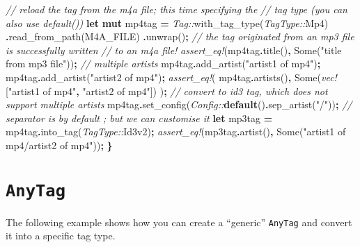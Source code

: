 \documentclass[
]{book}
\newenvironment{Shaded}{\begin{snugshade}}{\end{snugshade}}
\newcommand{\CommentTok}[1]{\textcolor[rgb]{0.56,0.35,0.01}{\textit{#1}}}
\newcommand{\ConstantTok}[1]{\textcolor[rgb]{0.00,0.00,0.00}{#1}}
\newcommand{\KeywordTok}[1]{\textcolor[rgb]{0.13,0.29,0.53}{\textbf{#1}}}
\newcommand{\NormalTok}[1]{#1}
\newcommand{\OperatorTok}[1]{\textcolor[rgb]{0.81,0.36,0.00}{\textbf{#1}}}
\newcommand{\PreprocessorTok}[1]{\textcolor[rgb]{0.56,0.35,0.01}{\textit{#1}}}
\newcommand{\StringTok}[1]{\textcolor[rgb]{0.31,0.60,0.02}{#1}}
\begin{document}
\begin{Shaded}
\begin{Highlighting}[]
    \CommentTok{// reload the tag from the m4a file; this time specifying the}
    \CommentTok{// tag type (you can also use \textasciigrave{}default()\textasciigrave{})}
    \KeywordTok{let} \KeywordTok{mut}\NormalTok{ mp4tag }\OperatorTok{=} \PreprocessorTok{Tag::}\NormalTok{with\_tag\_type(}\PreprocessorTok{TagType::}\NormalTok{Mp4)}
        \OperatorTok{.}\NormalTok{read\_from\_path(M4A\_FILE)}
        \OperatorTok{.}\NormalTok{unwrap()}\OperatorTok{;}
    \CommentTok{// the tag originated from an mp3 file is successfully written}
    \CommentTok{// to an m4a file!}
    \PreprocessorTok{assert\_eq!}\NormalTok{(mp4tag}\OperatorTok{.}\NormalTok{title()}\OperatorTok{,} \ConstantTok{Some}\NormalTok{(}\StringTok{"title from mp3 file"}\NormalTok{))}\OperatorTok{;}
    \CommentTok{// multiple artists}
\NormalTok{    mp4tag}\OperatorTok{.}\NormalTok{add\_artist(}\StringTok{"artist1 of mp4"}\NormalTok{)}\OperatorTok{;}
\NormalTok{    mp4tag}\OperatorTok{.}\NormalTok{add\_artist(}\StringTok{"artist2 of mp4"}\NormalTok{)}\OperatorTok{;}
    \PreprocessorTok{assert\_eq!}\NormalTok{(}
\NormalTok{        mp4tag}\OperatorTok{.}\NormalTok{artists()}\OperatorTok{,}
        \ConstantTok{Some}\NormalTok{(}\PreprocessorTok{vec!}\NormalTok{[}\StringTok{"artist1 of mp4"}\OperatorTok{,} \StringTok{"artist2 of mp4"}\NormalTok{])}
\NormalTok{    )}\OperatorTok{;}
    \CommentTok{// convert to id3 tag, which does not support multiple artists}
\NormalTok{    mp4tag}\OperatorTok{.}\NormalTok{set\_config(}\PreprocessorTok{Config::}\KeywordTok{default}\NormalTok{()}\OperatorTok{.}\NormalTok{sep\_artist(}\StringTok{"/"}\NormalTok{))}\OperatorTok{;}
    \CommentTok{// separator is by default \textasciigrave{};\textasciigrave{} but we can customise it}
    \KeywordTok{let}\NormalTok{ mp3tag }\OperatorTok{=}\NormalTok{ mp4tag}\OperatorTok{.}\NormalTok{into\_tag(}\PreprocessorTok{TagType::}\NormalTok{Id3v2)}\OperatorTok{;}
    \PreprocessorTok{assert\_eq!}\NormalTok{(mp3tag}\OperatorTok{.}\NormalTok{artist()}\OperatorTok{,} \ConstantTok{Some}\NormalTok{(}\StringTok{"artist1 of mp4/artist2 of mp4"}\NormalTok{))}\OperatorTok{;}
\OperatorTok{\}}
\end{Highlighting}
\end{Shaded}

\hypertarget{anytag}{%
\chapter{\texorpdfstring{\texttt{AnyTag}}{AnyTag}}\label{anytag}}

The following example shows how you can create a ``generic'' \texttt{AnyTag} and convert it into a specific tag type.
\end{document}
